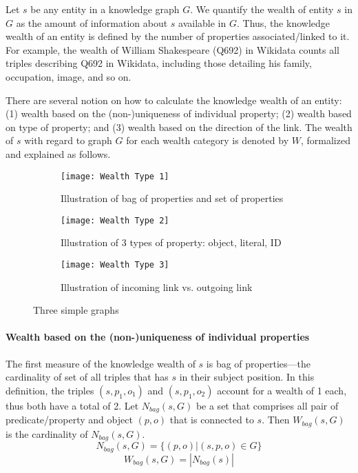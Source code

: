Let \(s\) be any entity in a knowledge graph \(G\). We quantify the wealth of entity \(s\) in \(G\) as the amount of information about \(s\) available in \(G\). Thus, the knowledge wealth of an entity is defined by the number of properties associated/linked to it. For example, the wealth of William Shakespeare (Q692) in Wikidata counts all triples describing Q692 in Wikidata, including those detailing his family, occupation, image, and so on.

There are several notion on how to calculate the knowledge wealth of an entity: (1) wealth based on the (non-)uniqueness of individual property; (2) wealth based on type of property; and (3) wealth based on the direction of the link. The wealth of \(s\) with regard to graph \(G\) for each wealth category is denoted by \(W\), formalized and explained as follows.

\begin{figure}[!h]
    \centering
    \begin{subfigure}[b]{0.3\textwidth}
        \centering
        \texttt{[image: Wealth Type 1]}
        \caption{Illustration of bag of properties and set of properties} \label{fig:wealth-type1}
    \end{subfigure}
    \hfill
    \begin{subfigure}[b]{0.3\textwidth}
        \centering
        \texttt{[image: Wealth Type 2]}
        \caption{Illustration of 3 types of property: object, literal, ID} \label{fig:wealth-type2}
    \end{subfigure}
    \hfill
    \begin{subfigure}[b]{0.3\textwidth}
        \centering
        \texttt{[image: Wealth Type 3]}
        \caption{Illustration of incoming link vs. outgoing link} \label{fig:wealth-type3}
    \end{subfigure}
    \caption{Three simple graphs} \label{fig:three graphs}
\end{figure}

\paragraph{Wealth based on the (non-)uniqueness of individual properties}
The first measure of the knowledge wealth of \(s\) is bag of properties---the cardinality of set of all triples that has \(s\) in their subject position. In this definition, the triples \((s, p_1, o_1)\) and \((s, p_1, o_2)\) account for a wealth of 1 each, thus both have a total of 2.
Let \(N_{bag}(s,G)\) be a set that comprises all pair of predicate/property and object \((p,o)\) that is connected to \(s\). Then \(W_{bag}(s, G)\) is the cardinality of \(N_{bag}(s,G)\).
\[
    N_{bag}(s,G) = \{(p, o) | (s, p, o) \in G\}
\]
\[
    W_{bag}(s,G) = |N_{bag}(s)|
\]

